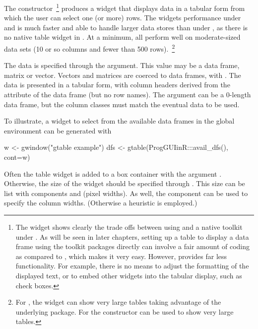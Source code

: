 The  constructor~\footnote{The
   widget shows clearly the trade offs between
  using  and a native toolkit under \R. As will be seen
  in later chapters, setting up a table to display a data frame using
  the toolkit packages directly can involve a fair amount of coding as
  compared to , which makes it very easy. However,
   provides far less functionality. For example, there
  is no means to adjust the formatting of the displayed text, or to
  embed other widgets into the tabular display, such as check boxes.
} produces a widget that displays data in a tabular form from which
the user can select one (or more) rows. The widgets performance under
 and  is much faster and able to
handle larger data stores
than under , as there is no native table widget in
\tcltk. At a minimum, all perform well on moderate-sized data sets (10
or so columns and fewer than 500 rows).~\footnote{For
  , the  widget can show very
  large tables taking advantage of the underlying 
  package. For  the constructor
   can be used to show very large tables.}

The data is specified through the 
argument. This value may be a data frame, matrix or vector. Vectors and
matrices are coerced to data frames, with
.  The data is presented in a tabular
form, with column headers derived from the  attribute of
the data frame (but no row names). The 
argument can be a $0$-length data frame, but the column classes must
match the eventual data to be used.


To illustrate, a widget to select from the available data frames in
the global environment can be generated with
\begin{Schunk}
\begin{Sinput}
 w <- gwindow("gtable example")
 dfs <- gtable(ProgGUIinR:::avail_dfs(), cont=w)
\end{Sinput}
\end{Schunk}

Often the table widget is added to a box container with the argument
. Otherwise, the size of the widget should be specified
through . This size can be list with components 
and  (pixel widths). As well, the component
 can be used to specify the column
widths. (Otherwise a heuristic is employed.)

